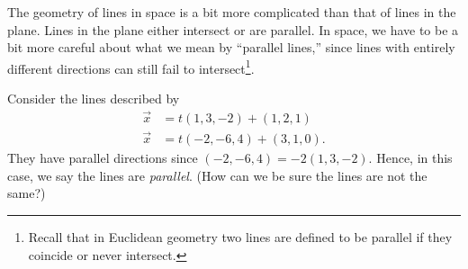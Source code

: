 The geometry of lines in space is a bit more complicated than that of lines
in the plane.  Lines in the plane either intersect or are parallel.
In space,  we have to be a bit more careful about what we mean by
``parallel lines,'' since lines with entirely different directions can
still fail to intersect\footnote{ Recall that in Euclidean geometry
two lines are defined to be parallel if they coincide or never intersect.}.

\begin{center}
\end{center}

\begin{example}
Consider the lines described by
\begin{align*}
\vec x &= t( 1, 3, -2 ) + ( 1, 2, 1 ) \\
\vec x &= t( -2, -6, 4) + ( 3, 1, 0 ).
\end{align*}
They have parallel directions since $( -2, -6, 4 ) = -2( 1, 3,-2 )$.
Hence, in this case, we say the lines are \emph{parallel}.  (How can
we be sure the lines are not the same?)
\end{example}

